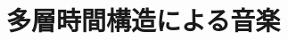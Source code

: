 \documentclass[uplatex,dvipdfmx]{ujarticle}
\begin{document}
%
%
%
%
%
%
%
%
%
%
%

\afterpage{\clearpage}
\newpage

\section{多層時間構造による音楽}
\end{document}
